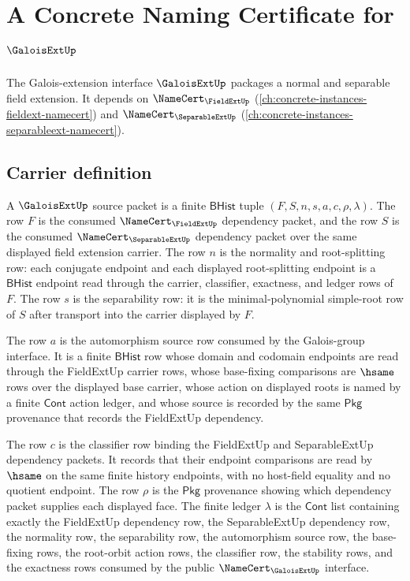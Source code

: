 \chapter{A Concrete Naming Certificate for $\GaloisExtUp$}
\label{ch:concrete-instances-galoisext-namecert}

The Galois-extension interface $\GaloisExtUp$ packages a normal and separable field extension. It depends on $\NameCert_{\FieldExtUp}$ (\autoref{ch:concrete-instances-fieldext-namecert}) and $\NameCert_{\SeparableExtUp}$ (\autoref{ch:concrete-instances-separableext-namecert}).

\section{Carrier definition}
\label{sec:galoisext-carrier}

\begin{definition}
\label{def:galoisext-bhist-source-packet}
A $\GaloisExtUp$ source packet is a finite $\mathsf{BHist}$ tuple
$(F,S,n,s,a,c,\rho,\lambda)$. The row $F$ is the consumed
$\NameCert_{\FieldExtUp}$ dependency packet, and the row $S$ is the consumed
$\NameCert_{\SeparableExtUp}$ dependency packet over the same displayed field
extension carrier. The row $n$ is the normality and root-splitting row: each
conjugate endpoint and each displayed root-splitting endpoint is a
$\mathsf{BHist}$ endpoint read through the carrier, classifier, exactness, and
ledger rows of $F$. The row $s$ is the separability row: it is the
minimal-polynomial simple-root row of $S$ after transport into the carrier
displayed by $F$.

The row $a$ is the automorphism source row consumed by the Galois-group
interface. It is a finite $\mathsf{BHist}$ row whose domain and codomain
endpoints are read through the FieldExtUp carrier rows, whose base-fixing
comparisons are $\hsame$ rows over the displayed base carrier, whose action on
displayed roots is named by a finite $\mathsf{Cont}$ action ledger, and whose
source is recorded by the same $\mathsf{Pkg}$ provenance that records the
FieldExtUp dependency.

The row $c$ is the classifier row binding the FieldExtUp and SeparableExtUp
dependency packets. It records that their endpoint comparisons are read by
$\hsame$ on the same finite history endpoints, with no host-field equality and
no quotient endpoint. The row $\rho$ is the $\mathsf{Pkg}$ provenance showing
which dependency packet supplies each displayed face. The finite ledger
$\lambda$ is the $\mathsf{Cont}$ list containing exactly the FieldExtUp
dependency row, the SeparableExtUp dependency row, the normality row, the
separability row, the automorphism source row, the base-fixing rows, the
root-orbit action rows, the classifier row, the stability rows, and the
exactness rows consumed by the public $\NameCert_{\GaloisExtUp}$ interface.
\end{definition}

